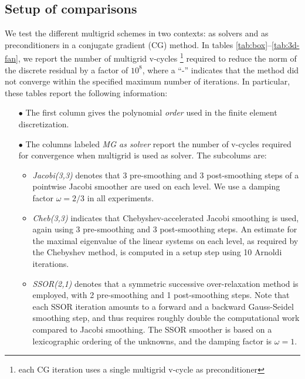\documentclass[times]{nlaauth}
\begin{document}
\subsection{Setup of comparisons}\label{subsec:measures}
We test the different multigrid schemes in two contexts: as solvers
and as preconditioners in a conjugate gradient (CG) method.  In tables
\ref{tab:box}--\ref{tab:3d-fan}, 
we report the number of multigrid v-cycles 
\footnote{each CG iteration uses a single multigrid
v-cycle as preconditioner} 
required to reduce the norm of the discrete
residual by a factor of $10^8$, where a ``-'' indicates that the
method did not converge within the specified maximum number of
iterations.
In particular, these tables report the following
information:
\begin{itemize}
\item[$\bullet$] The first column gives the polynomial \emph{order}
  used in the finite element discretization.
\item[$\bullet$] The columns labeled \emph{MG as solver} report
  the number of v-cycles required for convergence when multigrid is used as
  solver. The subcolums are:
  \begin{itemize}
  \item \emph{Jacobi(3,3)} denotes that 3 pre-smoothing and 3
    post-smoothing steps of a pointwise Jacobi smoother are used on
    each level. We use a damping factor $\omega=2/3$ in all experiments.
  \item \emph{Cheb(3,3)} indicates that Chebyshev-accelerated Jacobi
    smoothing is used, again using 3 pre-smoothing and 3
    post-smoothing steps. An estimate for the maximal eigenvalue of
    the linear systems on each level, as required by the Chebyshev
    method, is computed in a setup step using 10 Arnoldi iterations.
  \item \emph{SSOR(2,1)} denotes that a symmetric successive
    over-relaxation method is employed, with 2 pre-smoothing and 1
    post-smoothing steps. Note that each SSOR iteration amounts to a
    forward and a backward Gauss-Seidel smoothing step, and thus
    requires roughly double the computational work compared to Jacobi
    smoothing.  The SSOR smoother is based on a lexicographic ordering
    of the unknowns, and the damping factor is $\omega=1$.
  \end{itemize}

\end{itemize}
\end{document}
